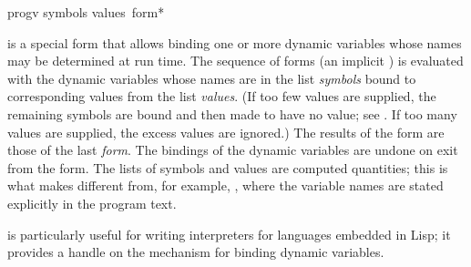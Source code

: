 \goodbreak

\begin{defspec}
progv symbols values {\,form}*

 is a special form that allows binding one or more dynamic
variables whose names may be determined at run time.  The sequence of
forms (an implicit )
is evaluated with the dynamic variables whose names are in the list
{\it symbols} bound to corresponding values from the list {\it values}.
(If too few values are supplied, the remaining symbols are bound and then
made to have no value; see .  If too many values are
supplied, the excess values are ignored.)  The results of the 
form are those of the last
{\it form}.  The bindings of the dynamic variables are undone on
exit from the  form.  The lists of symbols and values are
computed quantities; this is what makes  different from, for
example, , where the variable names are stated explicitly in
the program text.

 is particularly useful for writing interpreters for languages
embedded in Lisp; it provides a handle on the mechanism for binding
dynamic variables.
\end{defspec}

